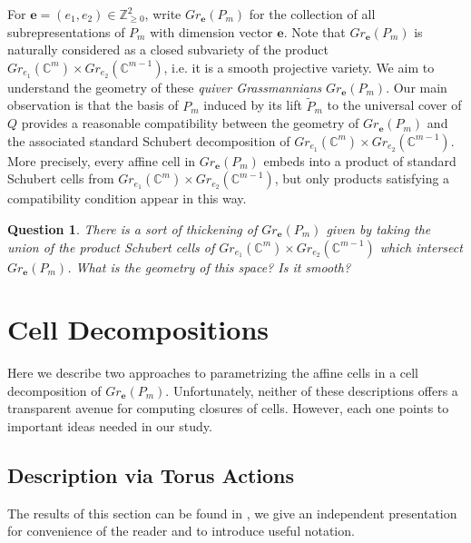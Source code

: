 \documentclass{amsart}
\newtheorem{question}{Question}
\numberwithin{equation}{section}
\newcommand{\CC}{\mathbb{C}}
\newcommand{\ZZ}{\mathbb{Z}}
\newcommand{\bfe}{\mathbf{e}}
\begin{document}
  For $\bfe=(e_1,e_2)\in\ZZ_{\ge0}^2$, write $Gr_\bfe(P_m)$ for the collection of all subrepresentations of $P_m$ with dimension vector $\bfe$.
  Note that $Gr_\bfe(P_m)$ is naturally considered as a closed subvariety of the product $Gr_{e_1}(\CC^m)\times Gr_{e_2}(\CC^{m-1})$, i.e. it is a smooth projective variety.
  We aim to understand the geometry of these \emph{quiver Grassmannians} $Gr_\bfe(P_m)$.
  Our main observation is that the basis of $P_m$ induced by its lift $\widetilde P_m$ to the universal cover of $Q$ provides a reasonable compatibility between the geometry of $Gr_\bfe(P_m)$ and the associated standard Schubert decomposition of $Gr_{e_1}(\CC^m)\times Gr_{e_2}(\CC^{m-1})$.
  More precisely, every affine cell in $Gr_\bfe(P_m)$ embeds into a product of standard Schubert cells from $Gr_{e_1}(\CC^m)\times Gr_{e_2}(\CC^{m-1})$, but only products satisfying a compatibility condition appear in this way.
  \begin{question}
    There is a sort of thickening of $Gr_\bfe(P_m)$ given by taking the union of the product Schubert cells of $Gr_{e_1}(\CC^m)\times Gr_{e_2}(\CC^{m-1})$ which intersect $Gr_\bfe(P_m)$.
    What is the geometry of this space?
    Is it smooth?
  \end{question}

\section{Cell Decompositions}
  Here we describe two approaches to parametrizing the affine cells in a cell decomposition of $Gr_\bfe(P_m)$.
  Unfortunately, neither of these descriptions offers a transparent avenue for computing closures of cells.
  However, each one points to important ideas needed in our study.

  \subsection{Description via Torus Actions}
    The results of this section can be found in \cite{cerulli irelli-esposito}, we give an independent presentation for convenience of the reader and to introduce useful notation.
\end{document}
